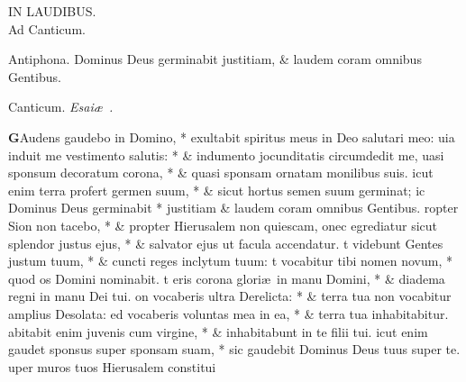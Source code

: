 \documentclass[letter,11pt]{book}
\begin{document}
\begin{multicols}{2}
\begin{center}
IN LAUDIBUS.\\
\color{Red} Ad Canticum.
\end{center} \vspace{-.5em}
\par \noindent \color{Red} Antiphona. \color{black} Dominus Deus germinabit justitiam, \& laudem coram omnibus Gentibus.
\vspace{-.5em} \begin{center} \color{Red} Canticum. \quad \color{black} \itshape Esai\ae \ . \end{center} \vspace{-.5em}
\lettrine[lines=2]{\bfseries \color{Red} G}{}Audens gaudebo in Domino, * exultabit spiritus meus in Deo salutari meo:
uia induit me vestimento salutis: * \& indumento jocunditatis circumdedit me,
uasi sponsum decoratum corona, * \& quasi sponsam ornatam monilibus suis.
icut enim terra profert germen suum, * \& sicut hortus semen suum germinat;
ic Dominus Deus germinabit * justitiam \& laudem coram omnibus Gentibus.
ropter Sion non tacebo, * \& propter Hierusalem non quiescam,
onec egrediatur sicut splendor justus ejus, * \& salvator ejus ut facula accendatur.
t videbunt Gentes justum tuum, * \& cuncti reges inclytum tuum:
t vocabitur tibi nomen novum, * quod os Domini nominabit.
t eris corona glori\ae \ in manu Domini, * \& diadema regni in manu Dei tui.
on vocaberis ultra Derelicta: * \& terra tua non vocabitur amplius Desolata:
ed vocaberis voluntas mea in ea, * \& terra tua inhabitabitur.
abitabit enim juvenis cum virgine, * \& inhabitabunt in te filii tui.
icut enim gaudet sponsus super sponsam suam, * sic gaudebit Dominus Deus tuus super te.
uper muros tuos Hierusalem constitui

\end{multicols}
\end{document}
